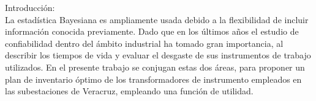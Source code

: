 \documentclass[letterpaper, titlepage,openright, twoside,11pt]{book}
\begin{document}
Introducci\'on:\\[0.2cm]

\noindent  La estad\'istica Bayesiana es ampliamente usada debido a la flexibilidad de incluir informaci\'on conocida previamente. Dado que en los \'ultimos a\~nos el estudio de confiabilidad dentro del \'ambito industrial ha tomado gran importancia, al describir los tiempos de vida y evaluar el desgaste de sus instrumentos de trabajo utilizados. En el presente trabajo se conjugan estas dos \'areas, para  proponer un plan de inventario \'optimo de los transformadores de instrumento empleados en las subestaciones de Veracruz, empleando una funci\'on de utilidad.
\end{document}
